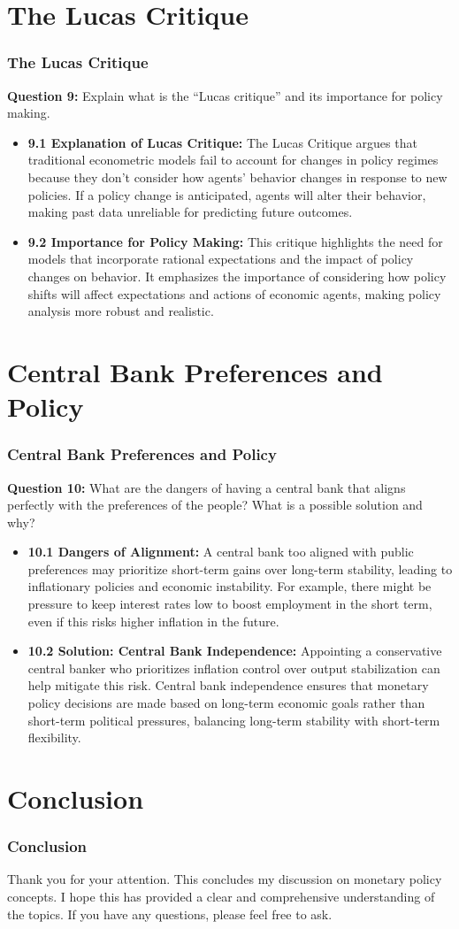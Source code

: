 \documentclass{beamer}
\begin{document}
\section{The Lucas Critique}
\begin{frame}
    \frametitle{The Lucas Critique}
    \textbf{Question 9:} Explain what is the ``Lucas critique'' and its importance for policy making.
    \begin{itemize}
        \item \textbf{9.1 Explanation of Lucas Critique:} The Lucas Critique argues that traditional econometric models fail to account for changes in policy regimes because they don't consider how agents' behavior changes in response to new policies. If a policy change is anticipated, agents will alter their behavior, making past data unreliable for predicting future outcomes.
        \item \textbf{9.2 Importance for Policy Making:} This critique highlights the need for models that incorporate rational expectations and the impact of policy changes on behavior. It emphasizes the importance of considering how policy shifts will affect expectations and actions of economic agents, making policy analysis more robust and realistic.
    \end{itemize}
\end{frame}

\section{Central Bank Preferences and Policy}
\begin{frame}
    \frametitle{Central Bank Preferences and Policy}
    \textbf{Question 10:} What are the dangers of having a central bank that aligns perfectly with the preferences of the people? What is a possible solution and why?
    \begin{itemize}
        \item \textbf{10.1 Dangers of Alignment:} A central bank too aligned with public preferences may prioritize short-term gains over long-term stability, leading to inflationary policies and economic instability. For example, there might be pressure to keep interest rates low to boost employment in the short term, even if this risks higher inflation in the future.
        \item \textbf{10.2 Solution: Central Bank Independence:} Appointing a conservative central banker who prioritizes inflation control over output stabilization can help mitigate this risk. Central bank independence ensures that monetary policy decisions are made based on long-term economic goals rather than short-term political pressures, balancing long-term stability with short-term flexibility.
    \end{itemize}
\end{frame}

\section{Conclusion}
\begin{frame}
    \frametitle{Conclusion}
    Thank you for your attention. This concludes my discussion on monetary policy concepts. I hope this has provided a clear and comprehensive understanding of the topics. If you have any questions, please feel free to ask.
\end{frame}
\end{document}
